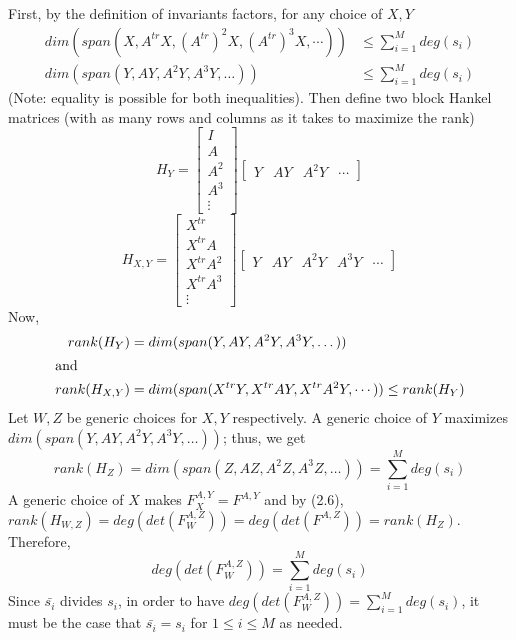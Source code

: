 \documentclass[12pt]{article}
\begin{document}
\noindent First, by the definition of invariants factors, for any choice of $X,Y$
\begin{align*}
	dim(span(X,A^{tr}X,(A^{tr})^2X, (A^{tr})^3X,\cdots)) &\le \sum_{i=1}^{M} deg(s_i)\\
	dim(span(Y,AY,A^2Y,A^3Y,\dots)) &\le \sum_{i=1}^{M} deg(s_i)
\end{align*}
(Note: equality is possible for both inequalities). Then define two block Hankel matrices (with as many
rows and columns as it takes to maximize the rank)
$$ H_Y =
\begin{bmatrix}
I \\ A \\ A^2 \\ A^3 \\ \vdots
\end{bmatrix}
\begin{bmatrix}
Y & AY &A^2Y & \cdots
\end{bmatrix}
$$
$$ H_{X,Y} =
\begin{bmatrix}
X^{tr} \\ X^{tr}A \\ X^{tr} A^2 \\ X^{tr} A^3 \\ \vdots
\end{bmatrix}
\begin{bmatrix}
Y & AY & A^2Y & A^3Y& \cdots
\end{bmatrix}
$$
Now,
\begin{align*}
rank(H_Y) &= dim(span(Y,AY,A^2Y,A^3Y,\dots))\\ \intertext{and}
rank(H_{X,Y}) &= dim(span(X^{tr}Y,X^{tr}AY,X^{tr}A^2Y,\cdots)) \le rank(H_Y)
\end{align*} 
Let $W,Z$ be generic choices for $X,Y$ respectively.
A generic choice of $Y$ maximizes $dim(span(Y,AY,A^2Y,A^3Y,\dots))$; thus, we get
$$rank(H_Z) = dim(span(Z,AZ,A^2Z,A^3Z,\dots)) = \sum_{i = 1}^{M} deg(s_i)$$
A generic choice of $X$ makes $F_X^{A,Y} = F^{A,Y}$ and by (2.6), 
$rank(H_{W,Z}) = deg(det(F_W^{A,Z})) = deg(det(F^{A,Z})) = rank(H_Z)$. Therefore,
$$deg(det(F_W^{A,Z})) = \sum_{i=1}^{M} deg(s_i)$$
Since $\bar{s_i}$ divides $s_i$, in order to have $deg(det(F_W^{A,Z})) = \sum_{i=1}^{M} deg(s_i)$,
it must be the case that $\bar{s_i} = s_i$ for $1 \le i \le M$ as needed.
\end{document}

